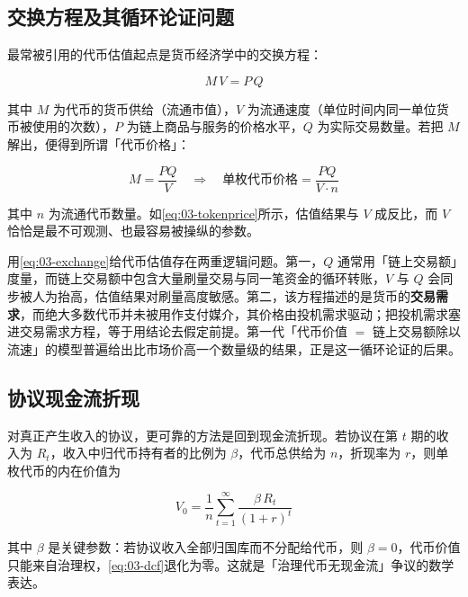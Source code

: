 \subsection{交换方程及其循环论证问题}

最常被引用的代币估值起点是货币经济学中的交换方程：

\begin{equation}
  M\,V = P\,Q
  \label{eq:03-exchange}
\end{equation}

其中 $M$ 为代币的货币供给（流通市值），$V$ 为流通速度（单位时间内同一单位货币被使用的次数），$P$ 为链上商品与服务的价格水平，$Q$ 为实际交易数量。若把 $M$ 解出，便得到所谓「代币价格」：

\begin{equation}
  M = \frac{PQ}{V}\quad\Longrightarrow\quad \text{单枚代币价格} = \frac{PQ}{V\cdot n}
  \label{eq:03-tokenprice}
\end{equation}

其中 $n$ 为流通代币数量。如\cref{eq:03-tokenprice}所示，估值结果与 $V$ 成反比，而 $V$ 恰恰是最不可观测、也最容易被操纵的参数。

\begin{warningbox}[交换方程的循环论证]
用\cref{eq:03-exchange}给代币估值存在两重逻辑问题。第一，$Q$ 通常用「链上交易额」度量，而链上交易额中包含大量刷量交易与同一笔资金的循环转账，$V$ 与 $Q$ 会同步被人为抬高，估值结果对刷量高度敏感。第二，该方程描述的是货币的\textbf{交易需求}，而绝大多数代币并未被用作支付媒介，其价格由投机需求驱动；把投机需求塞进交易需求方程，等于用结论去假定前提。第一代「代币价值 $=$ 链上交易额除以流速」的模型普遍给出比市场价高一个数量级的结果，正是这一循环论证的后果。
\end{warningbox}

\subsection{协议现金流折现}

对真正产生收入的协议，更可靠的方法是回到现金流折现。若协议在第 $t$ 期的收入为 $R_t$，收入中归代币持有者的比例为 $\beta$，代币总供给为 $n$，折现率为 $r$，则单枚代币的内在价值为

\begin{equation}
  V_0 = \frac{1}{n}\sum_{t=1}^{\infty}\frac{\beta\,R_t}{(1+r)^{t}}
  \label{eq:03-dcf}
\end{equation}

其中 $\beta$ 是关键参数：若协议收入全部归国库而不分配给代币，则 $\beta=0$，代币价值只能来自治理权，\cref{eq:03-dcf}退化为零。这就是「治理代币无现金流」争议的数学表达。

